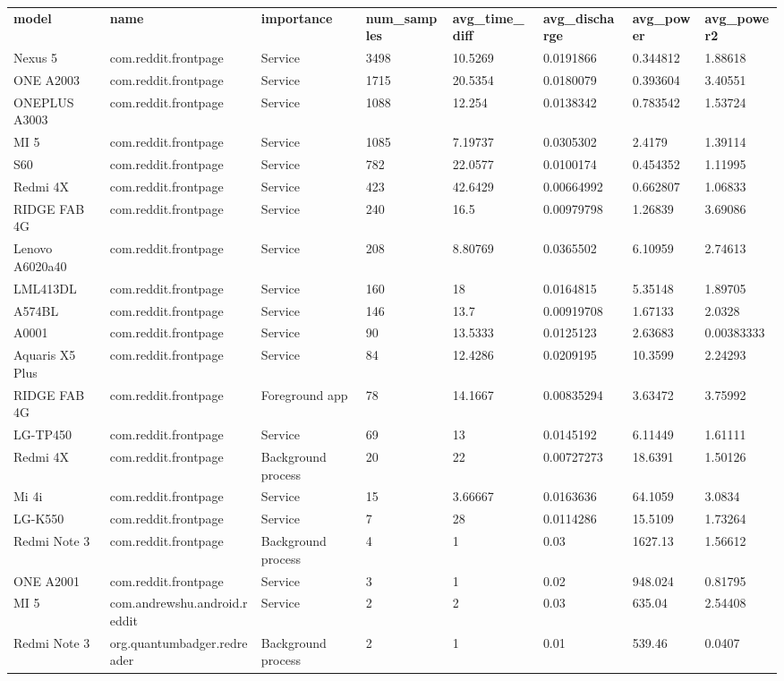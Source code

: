 \documentclass[
]{article}
\author{}
\date{}
\begin{document}
\begin{longtable}[]{@{}llllllll@{}}
\toprule
\endhead
\textbf{model} & \textbf{name} & \textbf{importance} &
\textbf{num\_samples} & \textbf{avg\_time\_diff} &
\textbf{avg\_discharge} & \textbf{avg\_power} &
\textbf{avg\_power2}\tabularnewline
Nexus 5 & com.reddit.frontpage & Service & 3498 & 10.5269 & 0.0191866 &
0.344812 & 1.88618\tabularnewline
ONE A2003 & com.reddit.frontpage & Service & 1715 & 20.5354 & 0.0180079
& 0.393604 & 3.40551\tabularnewline
ONEPLUS A3003 & com.reddit.frontpage & Service & 1088 & 12.254 &
0.0138342 & 0.783542 & 1.53724\tabularnewline
MI 5 & com.reddit.frontpage & Service & 1085 & 7.19737 & 0.0305302 &
2.4179 & 1.39114\tabularnewline
S60 & com.reddit.frontpage & Service & 782 & 22.0577 & 0.0100174 &
0.454352 & 1.11995\tabularnewline
Redmi 4X & com.reddit.frontpage & Service & 423 & 42.6429 & 0.00664992 &
0.662807 & 1.06833\tabularnewline
RIDGE FAB 4G & com.reddit.frontpage & Service & 240 & 16.5 & 0.00979798
& 1.26839 & 3.69086\tabularnewline
Lenovo A6020a40 & com.reddit.frontpage & Service & 208 & 8.80769 &
0.0365502 & 6.10959 & 2.74613\tabularnewline
LML413DL & com.reddit.frontpage & Service & 160 & 18 & 0.0164815 &
5.35148 & 1.89705\tabularnewline
A574BL & com.reddit.frontpage & Service & 146 & 13.7 & 0.00919708 &
1.67133 & 2.0328\tabularnewline
A0001 & com.reddit.frontpage & Service & 90 & 13.5333 & 0.0125123 &
2.63683 & 0.00383333\tabularnewline
Aquaris X5 Plus & com.reddit.frontpage & Service & 84 & 12.4286 &
0.0209195 & 10.3599 & 2.24293\tabularnewline
RIDGE FAB 4G & com.reddit.frontpage & Foreground app & 78 & 14.1667 &
0.00835294 & 3.63472 & 3.75992\tabularnewline
LG-TP450 & com.reddit.frontpage & Service & 69 & 13 & 0.0145192 &
6.11449 & 1.61111\tabularnewline
Redmi 4X & com.reddit.frontpage & Background process & 20 & 22 &
0.00727273 & 18.6391 & 1.50126\tabularnewline
Mi 4i & com.reddit.frontpage & Service & 15 & 3.66667 & 0.0163636 &
64.1059 & 3.0834\tabularnewline
LG-K550 & com.reddit.frontpage & Service & 7 & 28 & 0.0114286 & 15.5109
& 1.73264\tabularnewline
Redmi Note 3 & com.reddit.frontpage & Background process & 4 & 1 & 0.03
& 1627.13 & 1.56612\tabularnewline
ONE A2001 & com.reddit.frontpage & Service & 3 & 1 & 0.02 & 948.024 &
0.81795\tabularnewline
MI 5 & com.andrewshu.android.reddit & Service & 2 & 2 & 0.03 & 635.04 &
2.54408\tabularnewline
Redmi Note 3 & org.quantumbadger.redreader & Background process & 2 & 1
& 0.01 & 539.46 & 0.0407\tabularnewline
\bottomrule
\end{longtable}
\end{document}
